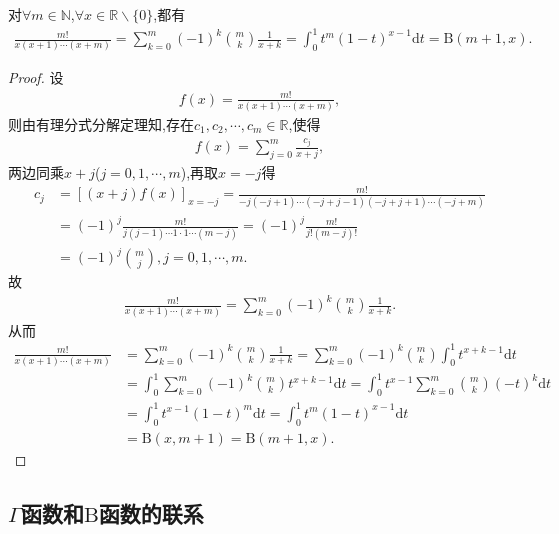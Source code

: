 \documentclass[../../main.tex]{subfiles}%
\begin{document}
\begin{proposition}\label{proposition:组合数相关常用恒等式}
对$\forall m\in \mathbb{N}$,$\forall x\in \mathbb{R} \backslash \{0\}$,都有
\begin{align*}
\frac{m!}{x(x+1)\cdots(x+m)}=\sum_{k=0}^m{(-1) ^k\binom{m}{k}\frac{1}{x+k}}=\int_0^1{t^m\left( 1-t \right) ^{x-1}\mathrm{d}t}=\mathrm{B}\left( m+1,x \right) .
\end{align*}
\end{proposition}
\begin{proof}

设
\begin{align*}
f(x)=\frac{m!}{x(x+1)\cdots(x+m)},
\end{align*}
则由有理分式分解定理知,存在$c_1,c_2,\cdots ,c_m\in \mathbb{R}$,使得
\begin{align*}
f(x)=\sum_{j=0}^m{\frac{c_j}{x+j}},
\end{align*}
两边同乘$x+j$($j=0,1,\cdots ,m$),再取$x=-j$得
\begin{align*}
c_j&=\left[ (x+j) f(x) \right] _{x=-j}=\frac{m!}{-j(-j+1)\cdots(-j+j-1)(-j+j+1)\cdots(-j+m)}
\\
&=(-1) ^j\frac{m!}{j(j-1)\cdots 1\cdot 1\cdots(m-j)}=(-1) ^j\frac{m!}{j!(m-j)!}
\\
&=(-1) ^j\binom{m}{j},j=0,1,\cdots ,m.
\end{align*}
故
\begin{align*}
\frac{m!}{x(x+1)\cdots(x+m)}=\sum_{k=0}^m{(-1) ^k\binom{m}{k}\frac{1}{x+k}}.
\end{align*}
从而
\begin{align*}
\frac{m!}{x\left( x+1 \right) \cdots \left( x+m \right)}&=\sum_{k=0}^m{\left( -1 \right) ^k\binom{m}{k}\frac{1}{x+k}}=\sum_{k=0}^m{\left( -1 \right) ^k\binom{m}{k}\int_0^1{t^{x+k-1}\mathrm{d}t}}
\\
&=\int_0^1{\sum_{k=0}^m{\left( -1 \right) ^k\binom{m}{k}t^{x+k-1}\mathrm{d}t}}=\int_0^1{t^{x-1}\sum_{k=0}^m{\binom{m}{k}\left( -t \right) ^k\mathrm{d}t}}
\\
&=\int_0^1{t^{x-1}\left( 1-t \right) ^m\mathrm{d}t}=\int_0^1{t^m\left( 1-t \right) ^{x-1}\mathrm{d}t}
\\
&=\mathrm{B}\left( x,m+1 \right) =\mathrm{B}\left( m+1,x \right) .
\end{align*}

\end{proof}




\subsection{$\Gamma$函数和$\mathrm{B}$函数的联系}
\end{document}
